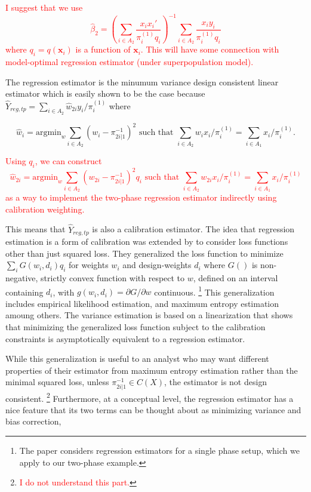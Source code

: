 \documentclass[12pt]{article}
\newcommand{\argmin}{{\text{argmin}}}
\newcommand{\bx}{\mathbf{x}}
\begin{document}
\textcolor{red}{I suggest that we use 
$$\hat \beta_2 = \left(\sum_{i \in A_2} 
  \frac{x_i x_i'}{\pi_{i}^{(1)} q_i }\right)^{-1} 
  \sum_{i \in A_2} \frac{x_i y_i}{\pi_i^{(1)} q_i }
$$ 
where $q_i=q(\bx_i)$ is a function of $\bx_i$. This will have some connection with model-optimal regression estimator (under superpopulation model).  
}

  
  The regression
estimator is the minumum variance design consistent linear estimator which is
easily shown to be the case because $\hat Y_{reg, tp} = \sum_{i \in A_2} \hat
w_{2i} y_i / \pi_i^{(1)}$ where 

$$\hat w_i = \argmin_{w} \sum_{i \in A_2} (w_i - \pi_{2i|1}^{-1})^2 \text{ such
that } \sum_{i \in A_2} w_i x_i / \pi_i^{(1)} = \sum_{i \in A_1} x_i /
\pi_i^{(1)}.$$

\textcolor{red}{Using $q_i$, we can construct 
$$\hat w_{2i} = \argmin_{w} \sum_{i \in A_2} (w_{2i} - \pi_{2i|1}^{-1})^2  q_i \text{ such
that } \sum_{i \in A_2} w_{2i}  x_i / \pi_i^{(1)} = \sum_{i \in A_1} x_i /
\pi_i^{(1)}$$
as a way to implement the two-phase regression estimator indirectly using calibration weighting. 
}


This means that $\hat Y_{reg, tp}$ is also a calibration estimator. The idea
that regression estimation is a form of calibration was extended by 
\cite{deville1992calibration} to consider loss functions other than just squared
loss. They generalized the loss function to minimize $\sum_i G(w_i, d_i)q_i$ for
weights $w_i$ and design-weights $d_i$ where $G()$ is non-negative, strictly
convex function with respect to $w$, defined on an interval containing $d_i$,
with $g(w_i, d_i) = \partial G / \partial w$ continuous.
\footnote{The \cite{deville1992calibration} paper considers regression estimators
for a single phase setup, which we apply to our two-phase example. } This
generalization includes empirical likelihood estimation, and maximum entropy
estimation amoung others. The variance estimation is based on a linearization
that shows that minimizing the generalized loss function subject to the
calibration constraints is asymptotically equivalent to a regression estimator.

While this generalization is useful to an analyst who may want different
properties of their estimator from maximum entropy estimation rather than the
minimal squared loss, unless $\pi_{2i|1}^{-1} \in C(X)$, the estimator is not
design consistent. \footnote{ \textcolor{red}{I do not understand this part.} } 
Furthermore, at a conceptual level, the regression estimator
has a nice feature that its two terms can be thought about as minimizing
variance and bias correction,
\end{document}
